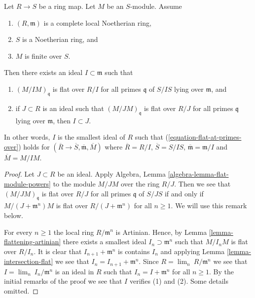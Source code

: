 \begin{lemma}
\label{lemma-flattening-complete-local-noetherian}
Let $R \to S$ be a ring map.
Let $M$ be an $S$-module.
Assume
\begin{enumerate}
\item $(R, \mathfrak m)$ is a complete local Noetherian ring,
\item $S$ is a Noetherian ring, and
\item $M$ is finite over $S$.
\end{enumerate}
Then there exists an ideal $I \subset \mathfrak m$ such that
\begin{enumerate}
\item $(M/IM)_{\mathfrak q}$ is flat over $R/I$ for all
primes $\mathfrak q$ of $S/IS$ lying over $\mathfrak m$, and
\item if $J \subset R$ is an ideal such that $(M/JM)_{\mathfrak q}$
is flat over $R/J$ for all primes $\mathfrak q$ lying over
$\mathfrak m$, then $I \subset J$.
\end{enumerate}
In other words, $I$ is the smallest ideal of $R$ such that
(\ref{equation-flat-at-primes-over}) holds for
$(\overline{R} \to \overline{S}, \overline{\mathfrak m}, \overline{M})$
where $\overline{R} = R/I$, $\overline{S} = S/IS$,
$\overline{\mathfrak m} = \mathfrak m/I$ and $\overline{M} = M/IM$.
\end{lemma}

\begin{proof}
Let $J \subset R$ be an ideal. Apply
Algebra, Lemma \ref{algebra-lemma-flat-module-powers}
to the module $M/JM$ over the ring $R/J$.
Then we see that $(M/JM)_{\mathfrak q}$
is flat over $R/J$ for all primes $\mathfrak q$ of $S/JS$
if and only if $M/(J + \mathfrak m^n)M$ is flat over
$R/(J + \mathfrak m^n)$ for all $n \geq 1$.
We will use this remark below.

\medskip\noindent
For every $n \geq 1$ the local ring $R/\mathfrak m^n$ is Artinian.
Hence, by
Lemma \ref{lemma-flattening-artinian}
there exists a smallest ideal $I_n \supset \mathfrak m^n$ such that
$M/I_nM$ is flat over $R/I_n$. It is clear that $I_{n + 1} + \mathfrak m^n$
is contains $I_n$ and applying
Lemma \ref{lemma-intersection-flat}
we see that $I_n = I_{n + 1} + \mathfrak m^n$. Since
$R = \lim_n\ R/\mathfrak m^n$ we see that $I = \lim_n\ I_n/\mathfrak m^n$
is an ideal in $R$ such that $I_n = I + \mathfrak m^n$ for all $n \geq 1$.
By the initial remarks of the proof we see that $I$ verifies (1)
and (2). Some details omitted.
\end{proof}


